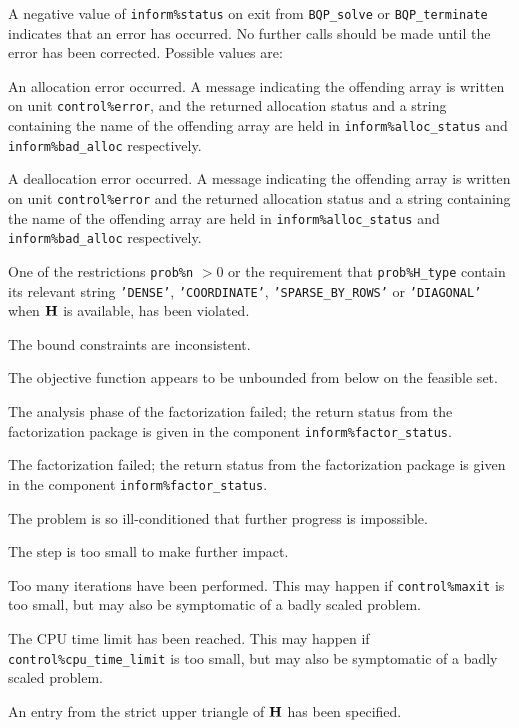 \documentclass{galahad}
\newcommand{\packagename}{BQP}
\begin{document}
\galerrors
A negative value of {\tt inform\%status} on exit from 
{\tt \packagename\_solve}
or 
{\tt \packagename\_terminate}
indicates that an error has occurred. No further calls should be made
until the error has been corrected. Possible values are:

\begin{description}

 An allocation error occurred. A message indicating 
the offending 
array is written on unit {\tt control\%error}, and the returned allocation 
status and a string containing the name of the offending array
are held in {\tt inform\%alloc\_\-status}
and {\tt inform\%bad\_alloc} respectively.

 A deallocation error occurred. 
A message indicating the offending 
array is written on unit {\tt control\%error} and the returned allocation 
status and a string containing the name of the offending array
are held in {\tt inform\%alloc\_\-status}
and {\tt inform\%bad\_alloc} respectively.

 One of the restrictions 
 {\tt prob\%n} $> 0$ 
    or the requirement that 
    {\tt prob\%H\_type} contain its relevant string
    {\tt 'DENSE'}, {\tt 'COORDINATE'}, {\tt 'SPARSE\_BY\_ROWS'}
    or {\tt 'DIAGONAL'} when ${\mathbf{H}}$ is available,
    has been violated.


 The bound constraints are inconsistent.

 The objective function appears to be unbounded 
  from below on the feasible set.

 The analysis phase of the factorization failed; 
  the return status from the factorization
    package is given in the component {\tt inform\%fac\-t\-or\_status}.

 The factorization failed; the return status 
  from the factorization
    package is given in the component {\tt inform\%fac\-t\-or\_status}.

 The problem is so ill-conditioned that 
 further progress is impossible.

 The step is too small to make further impact.

 Too many iterations have been performed. 
   This may happen if
    {\tt control\%maxit} is too small, but may also be symptomatic of 
    a badly scaled problem.

 The CPU time limit has been reached. This may happen if
    {\tt control\%cpu\_time\_limit} is too small, but may also be symptomatic 
    of a badly scaled problem.

 An entry from the strict upper triangle of ${\mathbf{H}}$ 
 has been specified.

\end{description}
\end{document}
